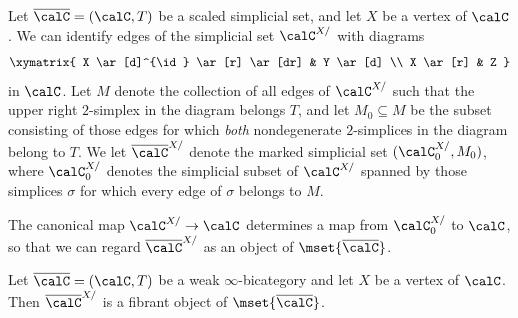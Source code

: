 \begin{notation}\label{caff}
Let $\overline{\calC} = (\calC, T)$ be a scaled simplicial set, and let $X$ be a vertex of $\calC$. 
We can identify edges of the simplicial set $\calC^{X/}$ with diagrams
$$ \xymatrix{ X \ar[d]^{\id} \ar[r] \ar[dr] & Y \ar[d] \\
X \ar[r] & Z }$$
in $\calC$. Let $M$ denote the collection of all edges of $\calC^{X/}$ such that the upper right $2$-simplex in the diagram belongs $T$, and let $M_0 \subseteq M$ be the subset consisting of those edges for which {\em both} nondegenerate $2$-simplices in the diagram belong to $T$.
We let $\overline{\calC}^{X/}$ denote the marked simplicial set $( \calC^{X/}_0, M_0)$, where
$\calC^{X/}_0$ denotes the simplicial subset of $\calC^{X/}$ spanned by those simplices
$\sigma$ for which every edge of $\sigma$ belongs to $M$.

The canonical map $\calC^{X/} \rightarrow \calC$ determines a map from $\calC^{X/}_0$ to $\calC$, so that we can regard $\overline{\calC}^{X/}$ as an object of $\mset{ \overline{\calC} }$. 
\end{notation}

\begin{proposition}\label{ilk}
Let $\overline{\calC} = (\calC, T)$ be a weak $\infty$-bicategory and let $X$ be a vertex of $\calC$. Then
$\overline{\calC}^{X/}$ is a fibrant object of $\mset{ \overline{\calC} }$. 
\end{proposition}


